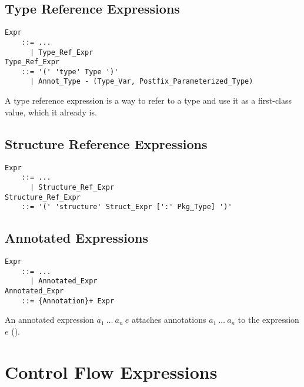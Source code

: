 \subsection{Type Reference Expressions}
\label{sec:type-ref-expressions}

\grammar\begin{lstlisting}
Expr 
    ::= ...
      | Type_Ref_Expr
Type_Ref_Expr 
    ::= '(' 'type' Type ')'
      | Annot_Type - (Type_Var, Postfix_Parameterized_Type)
\end{lstlisting}

A type reference expression is a way to refer to a type and use it as a first-class value, which it already is. 





\subsection{Structure Reference Expressions}
\label{sec:structure-ref-expressions}

\grammar\begin{lstlisting}
Expr 
    ::= ...
      | Structure_Ref_Expr
Structure_Ref_Expr 
    ::= '(' 'structure' Struct_Expr [':' Pkg_Type] ')'
\end{lstlisting}





\subsection{Annotated Expressions}
\label{sec:annotated-exprs}

\grammar\begin{lstlisting}
Expr
    ::= ...
      | Annotated_Expr
Annotated_Expr
    ::= {Annotation}+ Expr
\end{lstlisting}

An annotated expression $a_1\ \ldots\ a_n\ e$ attaches annotations $a_1\ \ldots\ a_n$ to the expression $e$ (). 





\section{Control Flow Expressions}





